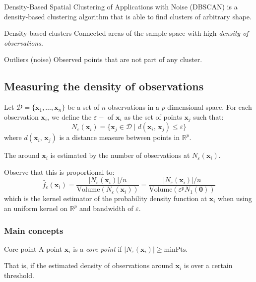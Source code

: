 Density-Based Spatial Clustering of Applications with Noise (DBSCAN) is
a density-based clustering algorithm that is able to find clusters of
arbitrary shape.

\begin{definition}{Density-based clusters}{}
	Connected areas of the sample space with high \emph{density of observations}.
\end{definition}

\begin{definition}{Outliers (noise)}{}
	Observed points that are not part of any cluster.
\end{definition}

\subsection{Measuring the density of observations}
Let $\mathcal{D} = \{ \boldsymbol{x}_1, \ldots, \boldsymbol{x}_n \}$ be a set of $n$ observations
in a $p$-dimensional space. For each observation $\boldsymbol{x}_i$, we define the $\varepsilon-$
of $\boldsymbol{x}_i$ as the set of points $\boldsymbol{x}_j$ such that:
\begin{equation*}
    N_{\varepsilon}(\boldsymbol{x}_i) = \bigl\{
    \boldsymbol{x}_j \in \mathcal{D} \mid d(\boldsymbol{x}_i,\,\boldsymbol{x}_j) \leq \varepsilon
    \bigr\}
\end{equation*}
where $d(\boldsymbol{x}_i,\,\boldsymbol{x}_j)$ is a distance measure between points in $\mathds{R}^p$.

The  around $\boldsymbol{x}_i$ is estimated by the number
of observations at $N_{\varepsilon}(\boldsymbol{x}_i)$.

Observe that this is proportional to:
\begin{equation*}
    \hat{f}_\varepsilon(\boldsymbol{x}_i) =
    \frac{|N_{\varepsilon}(\boldsymbol{x}_i)| / n}{\text{Volume}(N_{\varepsilon}(\boldsymbol{x}_i))}
    = \frac{|N_{\varepsilon}(\boldsymbol{x}_i)| / n}{\text{Volume}(\varepsilon^p N_{1}(\boldsymbol{0}))}
\end{equation*}
which is the kernel estimator of the probability density function at $\boldsymbol{x}_i$
when using an uniform kernel on $\mathds{R}^p$ and bandwidth of $\varepsilon$.

\subsubsection{Main concepts}
\begin{definition}{Core point}{}
    A point $\boldsymbol{x}_i$ is a \emph{core point} if $|N_{\varepsilon}(\boldsymbol{x}_i)| \geq \text{minPts}$.

    That is, if the estimated density of observations around $\boldsymbol{x}_i$ is over a certain threshold.
\end{definition}

